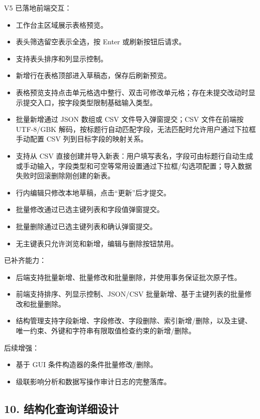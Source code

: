 \documentclass[
  a4paper,
  UTF8]{ctexart}
\providecommand{\tightlist}{%
  \setlength{\itemsep}{0pt}\setlength{\parskip}{0pt}}
\begin{document}
V5 已落地前端交互：

\begin{itemize}
\tightlist
\item
  工作台主区域展示表格预览。
\item
  表头筛选留空表示全选，按 Enter 或刷新按钮后请求。
\item
  支持表头排序和列显示控制。
\item
  新增行在表格顶部进入草稿态，保存后刷新预览。
\item
  表格预览支持点击单元格选中整行、双击可修改单元格；存在未提交改动时显示提交入口，按字段类型限制基础输入类型。
\item
  批量新增通过 JSON 数组或 CSV 文件导入弹窗提交；CSV 文件在前端按
  UTF-8/GBK
  解码，按标题行自动匹配字段，无法匹配时允许用户通过下拉框手动配置 CSV
  列到目标字段的映射关系。
\item
  支持从 CSV
  直接创建并导入新表：用户填写表名，字段可由标题行自动生成或手动输入，字段类型和可空等常用设置通过下拉框/勾选项配置；导入数据失败时回滚删除刚创建的新表。
\item
  行内编辑只修改本地草稿，点击``更新''后才提交。
\item
  批量修改通过已选主键列表和字段值弹窗提交。
\item
  批量删除通过已选主键列表和确认弹窗提交。
\item
  无主键表只允许浏览和新增，编辑与删除按钮禁用。
\end{itemize}

已补齐能力：

\begin{itemize}
\tightlist
\item
  后端支持批量新增、批量修改和批量删除，并使用事务保证批次原子性。
\item
  前端支持排序、列显示控制、JSON/CSV
  批量新增、基于主键列表的批量修改和批量删除。
\item
  结构管理支持字段新增、字段修改、字段删除、索引新增/删除，以及主键、唯一约束、外键和字符串有限取值检查约束的新增/删除。
\end{itemize}

后续增强：

\begin{itemize}
\tightlist
\item
  基于 GUI 条件构造器的条件批量修改/删除。
\item
  级联影响分析和数据写操作审计日志的完整落库。
\end{itemize}

\hypertarget{ux7ed3ux6784ux5316ux67e5ux8be2ux8be6ux7ec6ux8bbeux8ba1}{%
\subsection{10.
结构化查询详细设计}\label{ux7ed3ux6784ux5316ux67e5ux8be2ux8be6ux7ec6ux8bbeux8ba1}}
\end{document}
